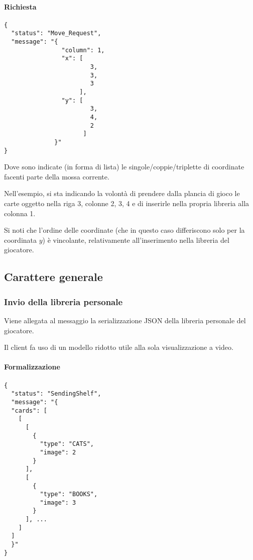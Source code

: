 \documentclass[a4paper,11pt]{article} %
\begin{document}
    \paragraph{Richiesta}
    \begin{verbatim}
{
  "status": "Move_Request",
  "message": "{
                "column": 1,
                "x": [
                        3,
                        3,
                        3
                     ],
                "y": [
                        3,
                        4,
                        2
                      ]
              }"
}
    \end{verbatim}

    Dove sono indicate (in forma di lista) le singole/coppie/triplette di coordinate facenti parte della mossa corrente.

    Nell'esempio, si sta indicando la volontà di prendere dalla plancia di gioco le carte oggetto nella riga 3,
    colonne 2, 3, 4 e di inserirle nella propria libreria alla colonna 1.

    Si noti che l'ordine delle coordinate (che in questo caso differiscono solo per la coordinata $y$) è vincolante, relativamente
    all'inserimento nella libreria del giocatore.

    \subsection{Carattere generale}\label{subsec:carattere-generale}

    \subsubsection{Invio della libreria personale}
    Viene allegata al messaggio la serializzazione JSON della libreria personale del giocatore.

    Il client fa uso di un modello ridotto utile alla sola visualizzazione a video.

    \paragraph{Formalizzazione}
    \begin{verbatim}
{
  "status": "SendingShelf",
  "message": "{
  "cards": [
    [
      [
        {
          "type": "CATS",
          "image": 2
        }
      ],
      [
        {
          "type": "BOOKS",
          "image": 3
        }
      ], ...
    ]
  ]
  }"
}
    \end{verbatim}
\end{document}
